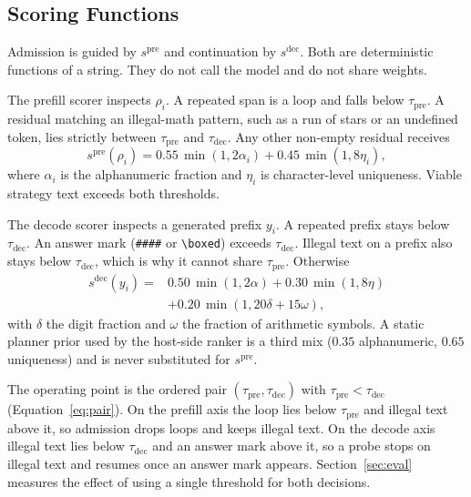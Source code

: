 \subsection{Scoring Functions}
\label{sec:scores}

Admission is guided by $s^{\mathrm{pre}}$ and continuation by $s^{\mathrm{dec}}$.
Both are deterministic functions of a string.
They do not call the model and do not share weights.

The prefill scorer inspects $\rho_i$.
A repeated span is a loop and falls below $\tau_{\mathrm{pre}}$.
A residual matching an illegal-math pattern, such as a run of stars or an undefined token, lies strictly between $\tau_{\mathrm{pre}}$ and $\tau_{\mathrm{dec}}$.
Any other non-empty residual receives
\begin{equation}
\label{eq:prefill-score}
s^{\mathrm{pre}}(\rho_i)=0.55\,\min(1,2\alpha_i)+0.45\,\min(1,8\eta_i),
\end{equation}
where $\alpha_i$ is the alphanumeric fraction and $\eta_i$ is character-level uniqueness.
Viable strategy text exceeds both thresholds.

The decode scorer inspects a generated prefix $y_i$.
A repeated prefix stays below $\tau_{\mathrm{dec}}$.
An answer mark (\texttt{\#\#\#\#} or \texttt{\textbackslash boxed}) exceeds $\tau_{\mathrm{dec}}$.
Illegal text on a prefix also stays below $\tau_{\mathrm{dec}}$, which is why it cannot share $\tau_{\mathrm{pre}}$.
Otherwise
\begin{equation}
\label{eq:decode-score}
\begin{aligned}
s^{\mathrm{dec}}(y_i)={}&0.50\,\min(1,2\alpha)+0.30\,\min(1,8\eta)\\
&+0.20\,\min(1,20\delta+15\omega),
\end{aligned}
\end{equation}
with $\delta$ the digit fraction and $\omega$ the fraction of arithmetic symbols.
A static planner prior used by the host-side ranker is a third mix ($0.35$ alphanumeric, $0.65$ uniqueness) and is never substituted for $s^{\mathrm{pre}}$.

The operating point is the ordered pair $(\tau_{\mathrm{pre}},\tau_{\mathrm{dec}})$ with $\tau_{\mathrm{pre}}<\tau_{\mathrm{dec}}$ (Equation~\ref{eq:pair}).
On the prefill axis the loop lies below $\tau_{\mathrm{pre}}$ and illegal text above it, so admission drops loops and keeps illegal text.
On the decode axis illegal text lies below $\tau_{\mathrm{dec}}$ and an answer mark above it, so a probe stops on illegal text and resumes once an answer mark appears.
Section~\ref{sec:eval} measures the effect of using a single threshold for both decisions.

